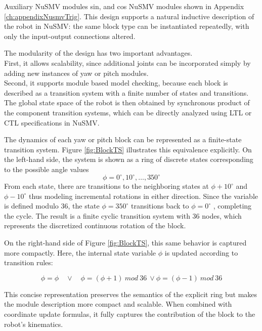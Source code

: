 

Auxiliary NuSMV modules sin, and cos NuSMV modules shown in Appendix \ref{ch:appendixNusmvTrig}.
This design supports a natural inductive description of 
the robot in NuSMV: the same block type can be instantiated repeatedly, 
with only the input-output connections altered.

The modularity of the design has two important advantages.\\
First, it allows scalability, since additional joints can be incorporated 
simply by adding new instances of yaw or pitch modules. \\
Second, it supports module based model checking, because each block is described 
as a transition system with a finite number of states and transitions. 
The global state space of the robot is then obtained by synchronous product of 
the component transition systems, which can be directly 
analyzed using LTL or CTL specifications in NuSMV.

The dynamics of each yaw or pitch block can be represented as a finite-state transition system. 
Figure \ref{fig:BlockTS} illustrates this equivalence explicitly. 
On the left-hand side, the system is shown as a ring of discrete states 
corresponding to the possible angle values 
\[ \phi=0^\circ,10^\circ,…,350^\circ \]
From each state, there are transitions to the neighboring states at 
$ \phi+10^\circ $
 and 
 $ \phi-10^\circ $
thus modeling incremental rotations in either direction. Since the variable is defined modulo 36, the state 
$ \phi=350^\circ $
 transitions back to 
 $ \phi=0^\circ $
, completing the cycle. The result is a finite cyclic transition system with 36 nodes, 
which represents the discretized continuous rotation of the block.

On the right-hand side of Figure \ref{fig:BlockTS}, this same behavior is captured more compactly.
Here, the internal state variable $\phi$ is updated according to transition rules:

\[ \phi=\phi \quad \lor \quad \phi=(\phi+1)\ mod\ 36\ \lor \phi=(\phi-1)\ mod\ 36 \]

This concise representation preserves the semantics of the explicit ring but makes the 
module description more compact and scalable. When combined with coordinate update 
formulas, it fully captures the contribution of the block to the robot’s kinematics.

